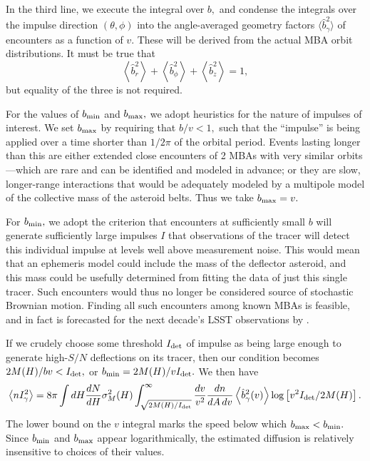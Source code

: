 \documentclass[linenumbers, onecolumn]{aastex631}
\newcommand\edited[1]{{\color{red} {#1}}}
\begin{document}
In the third line, we execute the integral over $b,$ and \edited{condense the integrals
over the impulse direction $(\theta,\phi)$ into the angle-averaged
geometry factors $\langle \hat b^2_\gamma\rangle$ of encounters as
a function of $v$.  These will be derived from the actual MBA orbit
distributions.} It must be true that
\begin{equation}
  \left\langle \hat b_r^2 \right\rangle
  + \left\langle \hat b_\phi^2 \right\rangle
  + \left\langle \hat b_z^2 \right\rangle = 1,
\end{equation}
but equality of the three is not required.

For the values of $b_{\rm min}$ and $b_{\rm max},$ we adopt heuristics
for the nature of impulses of interest.  We set $b_{\rm max}$ by 
requiring that $b/v<1,$ such that the ``impulse'' is being applied
over a time shorter than $1/2\pi$ of the orbital period.  Events
lasting longer than this are either extended close encounters of 2
MBAs with very similar orbits---which are rare and can be identified
and modeled in advance; or they are slow, longer-range interactions
that would be adequately modeled by a multipole model of the
collective mass of the asteroid belts.  Thus we take $b_{\rm max}=v.$

For $b_{\rm min},$ we adopt the criterion that encounters at
sufficiently small $b$ will generate sufficiently large impulses $I$
that observations of the tracer will detect this individual impulse at
levels well above measurement noise.  This would mean that an
ephemeris model could include the mass of the deflector asteroid, and
this mass could be usefully determined from fitting the data of just this
single tracer.
Such encounters would thus no longer be considered source of
stochastic Brownian motion.  Finding all such encounters among known
MBAs is feasible, and in fact is forecasted for the next decade's LSST
observations by
\citet{negin}. 

If we crudely choose some threshold
$I_{\rm det}$ of impulse as being large enough to generate high-$S/N$
deflections on its tracer, then our condition becomes $2M(H)/bv <
I_{\rm det},$ or $b_{\rm min}=2M(H)/vI_{\rm det}.$  We then have
\begin{equation}
   \left\langle n I_\gamma^2 \right\rangle = 
8\pi \int dH \frac{dN}{dH} \sigma^2_M(H)  \int_{\sqrt{2M(H)/I_{\rm
      det}}}^\infty \frac{dv}{v^2} 
        \frac{dn}{dA\,dv}  \left\langle\hat b_\gamma^2(v)\right\rangle
        \log \left[v^2 I_{\rm det}/2M(H)\right].
        \label{eq:nI2}
      \end{equation}
The lower bound on the $v$ integral marks the speed below which
$b_{\rm max}<b_{\rm min}.$  Since $b_{\rm min}$ and $b_{\rm max}$
appear logarithmically, the estimated diffusion is relatively insensitive to choices of
their values.
\end{document}
